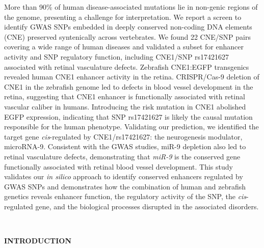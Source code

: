 \documentclass[]{article}
\begin{document}
More than 90\% of human disease-associated mutations lie in non-genic
regions of the genome, presenting a challenge for interpretation. We
report a screen to identify GWAS SNPs embedded in deeply conserved
non-coding DNA elements (CNE) preserved syntenically across vertebrates.
We found 22 CNE/SNP pairs covering a wide range of human diseases and
validated a subset for enhancer activity and SNP regulatory function,
including CNE1/SNP rs17421627 associated with retinal vasculature
defects. Zebrafish CNE1:EGFP transgenics revealed human CNE1 enhancer
activity in the retina. CRISPR/Cas-9 deletion of CNE1 in the zebrafish
genome led to defects in blood vessel development in the retina,
suggesting that CNE1 enhancer is functionally associated with retinal
vascular caliber in humans. Introducing the risk mutation in CNE1
abolished EGFP expression, indicating that SNP rs17421627 is likely the
causal mutation responsible for the human phenotype. Validating our
prediction, we identified the target gene \emph{cis}-regulated by
CNE1/rs17421627: the neurogenesis modulator, microRNA-9. Consistent with
the GWAS studies, miR-9 depletion also led to retinal vasculature
defects, demonstrating that \emph{miR-9} is the conserved gene
functionally associated with retinal blood vessel development. This
study validates our \emph{in silico} approach to identify conserved
enhancers regulated by GWAS SNPs and demonstrates how the combination of
human and zebrafish genetics reveals enhancer function, the regulatory
activity of the SNP, the \emph{cis}-regulated gene, and the biological
processes disrupted in the associated disorders.

\textbf{\\
}

\textbf{INTRODUCTION}
\end{document}
